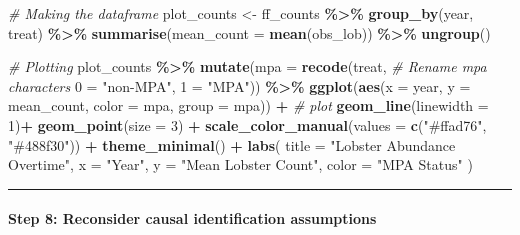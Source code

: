 \documentclass[
]{article}
\newenvironment{Shaded}{\begin{snugshade}}{\end{snugshade}}
\newcommand{\AttributeTok}[1]{\textcolor[rgb]{0.13,0.29,0.53}{#1}}
\newcommand{\CommentTok}[1]{\textcolor[rgb]{0.56,0.35,0.01}{\textit{#1}}}
\newcommand{\DecValTok}[1]{\textcolor[rgb]{0.00,0.00,0.81}{#1}}
\newcommand{\FunctionTok}[1]{\textcolor[rgb]{0.13,0.29,0.53}{\textbf{#1}}}
\newcommand{\NormalTok}[1]{#1}
\newcommand{\OtherTok}[1]{\textcolor[rgb]{0.56,0.35,0.01}{#1}}
\newcommand{\SpecialCharTok}[1]{\textcolor[rgb]{0.81,0.36,0.00}{\textbf{#1}}}
\newcommand{\StringTok}[1]{\textcolor[rgb]{0.31,0.60,0.02}{#1}}
\begin{document}
\begin{Shaded}
\begin{Highlighting}[]
\CommentTok{\# Making the dataframe }
\NormalTok{plot\_counts }\OtherTok{\textless{}{-}}\NormalTok{ ff\_counts }\SpecialCharTok{\%\textgreater{}\%} 
    \FunctionTok{group\_by}\NormalTok{(year, treat) }\SpecialCharTok{\%\textgreater{}\%} 
    \FunctionTok{summarise}\NormalTok{(}\AttributeTok{mean\_count =} \FunctionTok{mean}\NormalTok{(obs\_lob)) }\SpecialCharTok{\%\textgreater{}\%} 
    \FunctionTok{ungroup}\NormalTok{()}

\CommentTok{\# Plotting }
\NormalTok{plot\_counts }\SpecialCharTok{\%\textgreater{}\%}
    \FunctionTok{mutate}\NormalTok{(}\AttributeTok{mpa =} \FunctionTok{recode}\NormalTok{(treat, }\CommentTok{\# Rename mpa characters }
                        \StringTok{\textasciigrave{}}\AttributeTok{0}\StringTok{\textasciigrave{}} \OtherTok{=} \StringTok{"non{-}MPA"}\NormalTok{, }
                        \StringTok{\textasciigrave{}}\AttributeTok{1}\StringTok{\textasciigrave{}} \OtherTok{=} \StringTok{"MPA"}\NormalTok{)) }\SpecialCharTok{\%\textgreater{}\%} 
    \FunctionTok{ggplot}\NormalTok{(}\FunctionTok{aes}\NormalTok{(}\AttributeTok{x =}\NormalTok{ year, }\AttributeTok{y =}\NormalTok{ mean\_count, }\AttributeTok{color =}\NormalTok{ mpa, }\AttributeTok{group =}\NormalTok{ mpa)) }\SpecialCharTok{+} \CommentTok{\# plot }
    \FunctionTok{geom\_line}\NormalTok{(}\AttributeTok{linewidth =} \DecValTok{1}\NormalTok{)}\SpecialCharTok{+} 
    \FunctionTok{geom\_point}\NormalTok{(}\AttributeTok{size =} \DecValTok{3}\NormalTok{) }\SpecialCharTok{+} 
    \FunctionTok{scale\_color\_manual}\NormalTok{(}\AttributeTok{values =} \FunctionTok{c}\NormalTok{(}\StringTok{"\#ffad76"}\NormalTok{, }\StringTok{"\#488f30"}\NormalTok{)) }\SpecialCharTok{+} 
    \FunctionTok{theme\_minimal}\NormalTok{() }\SpecialCharTok{+} 
    \FunctionTok{labs}\NormalTok{(}
        \AttributeTok{title =} \StringTok{"Lobster Abundance Overtime"}\NormalTok{, }
        \AttributeTok{x =} \StringTok{"Year"}\NormalTok{, }
        \AttributeTok{y =} \StringTok{"Mean Lobster Count"}\NormalTok{, }
        \AttributeTok{color =} \StringTok{"MPA Status"}
\NormalTok{    )}
\end{Highlighting}
\end{Shaded}

\begin{center}\rule{0.5\linewidth}{0.5pt}\end{center}

\paragraph{Step 8: Reconsider causal identification
assumptions}\label{step-8-reconsider-causal-identification-assumptions}
\end{document}
